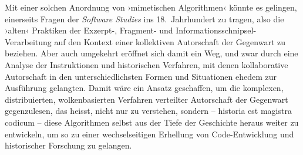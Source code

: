 \documentclass[a4paper,10pt]{article}
\newcommand{\inanf}[1]{›#1‹}
\begin{document}
Mit einer solchen Anordnung von \inanf{mimetischen Algorithmen} könnte es  gelingen, einerseits Fragen der \emph{Software Studies} ins 18.~Jahrhundert zu tragen, also die \inanf{alten} Praktiken der Exzerpt-, Fragment- und Informationsschnipsel-Verarbeitung auf den Kontext einer kollektiven Autorschaft der Gegenwart zu beziehen. Aber auch umgekehrt eröffnet sich damit ein Weg, und zwar durch eine Analyse der Instruktionen und historischen Verfahren, mit denen kollaborative Autorschaft in den unterschiedlichsten Formen und Situationen ehedem zur Ausführung gelangten. Damit wäre ein Ansatz geschaffen, um die komplexen, distribuierten, wolkenbasierten Verfahren verteilter Autorschaft der Gegenwart gegenzulesen, das heisst, nicht nur zu verstehen, sondern – historia est magistra codicum – diese Algorithmen selbst aus der Tiefe der Geschichte heraus weiter zu entwickeln, um so zu einer wechselseitigen Erhellung von Code-Entwicklung und historischer Forschung zu gelangen. 

\printbibliography


\end{document}
